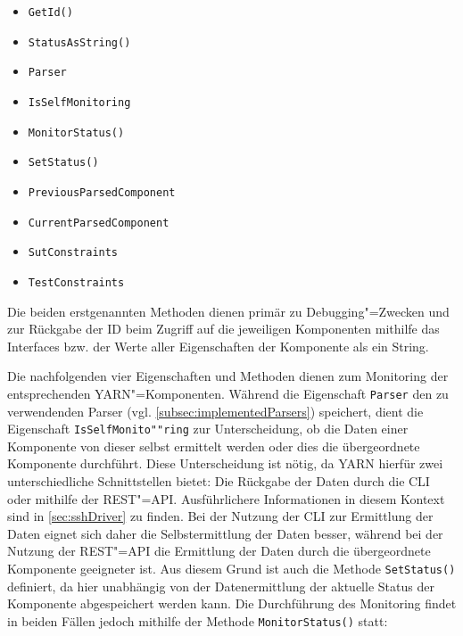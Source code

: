 \begin{itemize}
    \item \texttt{GetId()}
    \item \texttt{StatusAsString()}
    
    \item \texttt{Parser}
    \item \texttt{IsSelfMonitoring}
    \item \texttt{MonitorStatus()}
    \item \texttt{SetStatus()}
    
    \item \texttt{PreviousParsedComponent}
    \item \texttt{CurrentParsedComponent}
    \item \texttt{SutConstraints}
    \item \texttt{TestConstraints}
\end{itemize}

Die beiden erstgenannten Methoden dienen primär zu Debugging"=Zwecken und zur Rückgabe der ID beim Zugriff auf die jeweiligen Komponenten mithilfe das Interfaces bzw. der Werte aller Eigenschaften der Komponente als ein String.

Die nachfolgenden vier Eigenschaften und Methoden dienen zum Monitoring der entsprechenden YARN"=Komponenten.
Während die Eigenschaft \texttt{Parser} den zu verwendenden Parser (vgl. \cref{subsec:implementedParsers}) speichert, dient die Eigenschaft \texttt{IsSelfMonito""ring} zur Unterscheidung, ob die Daten einer Komponente von dieser selbst ermittelt werden oder dies die übergeordnete Komponente durchführt.
Diese Unterscheidung ist nötig, da YARN hierfür zwei unterschiedliche Schnittstellen bietet: Die Rückgabe der Daten durch die \gls{CLI} oder mithilfe der REST"=API.
Ausführlichere Informationen in diesem Kontext sind in \cref{sec:sshDriver} zu finden.
Bei der Nutzung der \gls{CLI} zur Ermittlung der Daten eignet sich daher die Selbstermittlung der Daten besser, während bei der Nutzung der REST"=API die Ermittlung der Daten durch die übergeordnete Komponente geeigneter ist.
Aus diesem Grund ist auch die Methode \texttt{SetStatus()} definiert, da hier unabhängig von der Datenermittlung der aktuelle Status der Komponente abgespeichert werden kann.
Die Durchführung des Monitoring findet in beiden Fällen jedoch mithilfe der Methode \texttt{MonitorStatus()} statt:

